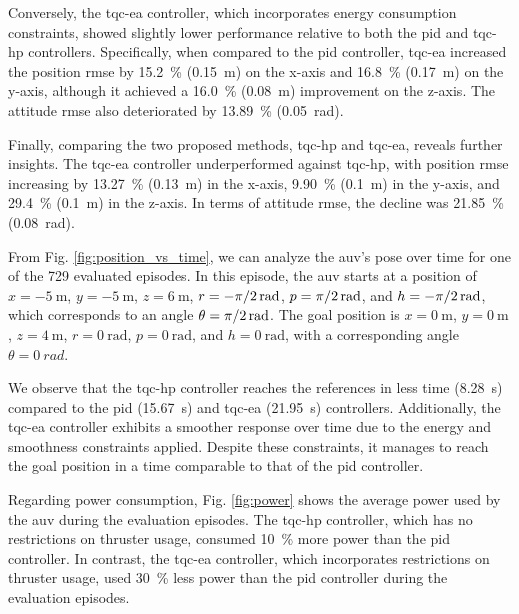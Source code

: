 Conversely, the \ac{tqc-ea} controller, which incorporates energy consumption constraints, showed slightly lower performance relative to both the \ac{pid} and \ac{tqc-hp} controllers. Specifically, when compared to the \ac{pid} controller, \ac{tqc-ea} increased the position \ac{rmse} by \SI{15.2}{\percent} (\SI{0.15}{\meter}) on the x-axis and \SI{16.8}{\percent} (\SI{0.17}{\meter}) on the y-axis, although it achieved a \SI{16.0}{\percent} (\SI{0.08}{\meter}) improvement on the z-axis. The attitude \ac{rmse} also deteriorated by \SI{13.89}{\percent} (\SI{0.05}{\radian}).

Finally, comparing the two proposed methods, \ac{tqc-hp} and \ac{tqc-ea}, reveals further insights. The \ac{tqc-ea} controller underperformed against \ac{tqc-hp}, with position \ac{rmse} increasing by \SI{13.27}{\percent} (\SI{0.13}{\meter}) in the x-axis, \SI{9.90}{\percent} (\SI{0.1}{\meter}) in the y-axis, and \SI{29.4}{\percent} (\SI{0.1}{\meter}) in the z-axis. In terms of attitude \ac{rmse}, the decline was \SI{21.85}{\percent} (\SI{0.08}{\radian}).

From Fig. \ref{fig:position_vs_time}, we can analyze the \ac{auv}'s pose over time for one of the 729 evaluated episodes. In this episode, the \ac{auv} starts at a position of $x = \SI{-5}{\meter}$, $y = \SI{-5}{\meter}$, $z = \SI{6}{\meter}$, $r = \SI[parse-numbers=false]{-\pi/2}{\radian}$, $p = \SI[parse-numbers=false]{\pi/2}{\radian}$, and $h = \SI[parse-numbers=false]{-\pi/2}{\radian}$, which corresponds to an angle $\theta = \SI[parse-numbers=false]{\pi/2}{\radian}$. The goal position is $x = \SI{0}{\meter}$, $y = \SI{0}{\meter}$, $z = \SI{4}{\meter}$, $r = \SI{0}{\radian}$, $p = \SI{0}{\radian}$, and $h = \SI{0}{\radian}$, with a corresponding angle $\theta = \SI{0}{rad}$.

We observe that the \ac{tqc-hp} controller reaches the references in less time (\SI{8.28}{\second}) compared to the \ac{pid} (\SI{15.67}{\second}) and \ac{tqc-ea} (\SI{21.95}{\second}) controllers. Additionally, the \ac{tqc-ea} controller exhibits a smoother response over time due to the energy and smoothness constraints applied. Despite these constraints, it manages to reach the goal position in a time comparable to that of the \ac{pid} controller.

Regarding power consumption, Fig. \ref{fig:power} shows the average power used by the \ac{auv} during the evaluation episodes. The \ac{tqc-hp} controller, which has no restrictions on thruster usage, consumed \SI{10}{\percent} more power than the \ac{pid} controller. In contrast, the \ac{tqc-ea} controller, which incorporates restrictions on thruster usage, used \SI{30}{\percent} less power than the \ac{pid} controller during the evaluation episodes.

